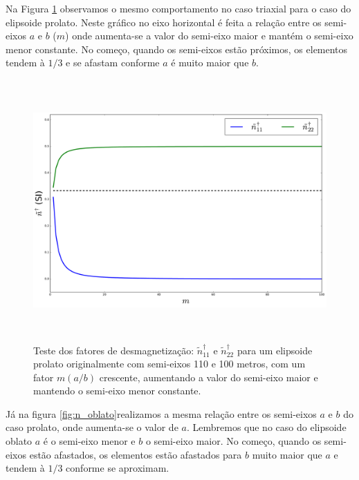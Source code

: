 Na Figura \ref{fig:n_prolato} observamos o mesmo comportamento no caso triaxial para o caso do elipsoide prolato. Neste gráfico no eixo horizontal é feita a relação entre os semi-eixos $a$ e $b$ ($m$) onde aumenta-se a valor do semi-eixo maior e mantém o semi-eixo menor constante. No começo, quando os semi-eixos estão próximos, os elementos tendem à $1/3$ e se afastam conforme $a$ é muito maior que $b$.
\newpage

\begin{figure}[hbt!]
	\centering \includegraphics[width=15cm,height=10cm]{figures/test_n_prolate}
	\caption[Teste dos fatores de desmagnetização para um elipsoide prolato.]{Teste dos fatores de desmagnetização:
		$\tilde{n}^{\dagger}_{11}$ e $\tilde{n}^{\dagger}_{22}$
		para um elipsoide prolato originalmente com semi-eixos 110 e 100 metros, com um fator $m (a/b)$ crescente,
		aumentando a valor do semi-eixo maior e mantendo o semi-eixo menor constante.}
	\label{fig:n_prolato}
\end{figure}

Já na figura \ref{fig:n_oblato}realizamos a mesma relação entre os semi-eixos $a$ e $b$ do caso prolato, onde aumenta-se o valor de $a$. Lembremos que no caso do elipsoide oblato $a$ é o semi-eixo menor e $b$ o semi-eixo maior. No começo, quando os semi-eixos estão afastados, os elementos estão afastados para $b$ muito maior que $a$ e tendem à $1/3$ conforme se aproximam.
\newpage

